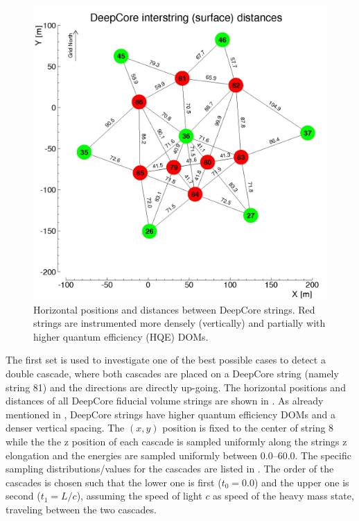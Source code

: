 \begin{figure}[h]
    \centering
    \includegraphics{figures/icecube_deepcore/deepcore_surface_distances.jpg}
    \caption[xx]{Horizontal positions and distances between DeepCore strings. Red strings are instrumented more densely (vertically) and partially with higher quantum efficiency (HQE) DOMs.}
\end{figure}

The first set is used to investigate one of the best possible cases to detect a double cascade, where both cascades are placed on a DeepCore string (namely string 81) and the directions are directly up-going. The horizontal positions and distances of all DeepCore fiducial volume strings are shown in . As already mentioned in , DeepCore strings have higher quantum efficiency DOMs and a denser vertical spacing. The $(x,y)$ position is fixed to the center of string 8 while the the z position of each cascade is sampled uniformly along the strings z elongation and the energies are sampled uniformly between \SIrange{0.0}{60.0}{\gev}. The specific sampling distributions/values for the cascades are listed in . The order of the cascades is chosen such that the lower one is first ($t_0=0.0$) and the upper one is second ($t_1=L/c$), assuming the speed of light $c$ as speed of the heavy mass state, traveling between the two cascades.

